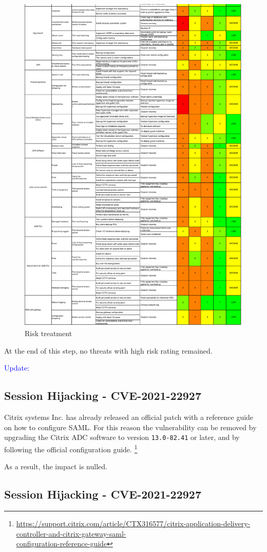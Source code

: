 \begin{figure}[t!]
    \centering
    \includegraphics[keepaspectratio,width=1\textwidth]{03-risk-analysis/005-RT/img/riskTreatCut2.pdf}
    \caption{Risk treatment}
    \label{fig:riskTreatCut2}
\end{figure}

At the end of this step, no threats with high risk rating remained.

\noindent \textcolor{blue}{Update:}

\subsection*{Session Hijacking - CVE-2021-22927}

Citrix systems Inc. has already released an official patch with a reference guide on how to configure SAML. For this reason the vulnerability can be removed by upgrading the Citrix ADC software to version \texttt{13.0-82.41} or later, and by following the official configuration guide. \footnote{\href{https://support.citrix.com/article/CTX316577/citrix-application-delivery-controller-and-citrix-gateway-saml-configuration-reference-guide} {https://support.citrix.com/article/CTX316577/citrix-application-delivery-controller-and-citrix-gateway-saml-\\configuration-reference-guide}}

As a result, the impact is nulled.

\subsection*{Session Hijacking - CVE-2021-22927}


